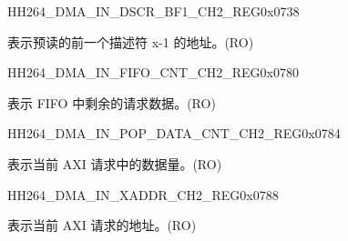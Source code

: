     
    \begin{register}{H}{H264\_DMA\_IN\_DSCR\_BF1\_CH2\_REG}{0x0738}\label{regdesc:H264DMAINDSCRBF1CH2REG}
    \regnewline%
    \begin{regdesc}\begin{reglist}
    \label{fielddesc:H264DMAINLINKDSCRBF1CH2}\item [H264\_DMA\_INLINK\_DSCR\_BF1\_CH2] 表示预读的前一个描述符 x-1 的地址。(RO)
    \end{reglist}\end{regdesc}
    \end{register}
    
    \begin{register}{H}{H264\_DMA\_IN\_FIFO\_CNT\_CH2\_REG}{0x0780}\label{regdesc:H264DMAINFIFOCNTCH2REG}
    \regnewline%
    \begin{regdesc}\begin{reglist}
    \label{fielddesc:H264DMAINCMDFIFOINFIFOCNTCH2}\item [H264\_DMA\_IN\_CMDFIFO\_INFIFO\_CNT\_CH2] 表示 FIFO 中剩余的请求数据。(RO)
    \end{reglist}\end{regdesc}
    \end{register}
    
    
    \begin{register}{H}{H264\_DMA\_IN\_POP\_DATA\_CNT\_CH2\_REG}{0x0784}\label{regdesc:H264DMAINPOPDATACNTCH2REG}
    \regnewline%
    \begin{regdesc}\begin{reglist}
    \label{fielddesc:H264DMAINCMDFIFOPOPDATACNTCH2}\item [H264\_DMA\_IN\_CMDFIFO\_POP\_DATA\_CNT\_CH2] 表示当前 AXI 请求中的数据量。(RO)
    \end{reglist}\end{regdesc}
    \end{register}
    
    
    \begin{register}{H}{H264\_DMA\_IN\_XADDR\_CH2\_REG}{0x0788}\label{regdesc:H264DMAINXADDRCH2REG}
    \regnewline%
    \begin{regdesc}\begin{reglist}
    \label{fielddesc:H264DMAINCMDFIFOXADDRCH2}\item [H264\_DMA\_IN\_CMDFIFO\_XADDR\_CH2] 表示当前 AXI 请求的地址。(RO)
    \end{reglist}\end{regdesc}
    \end{register}
    
